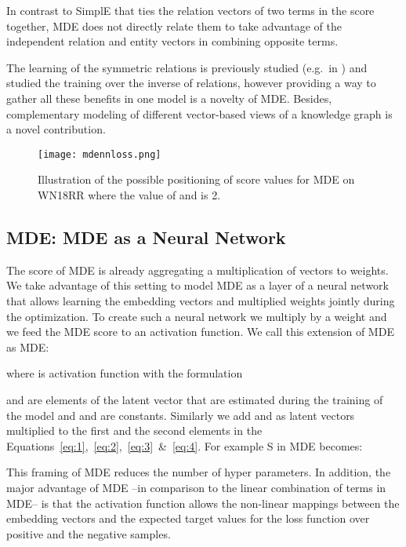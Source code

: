 \documentclass{ecai}
\begin{document}
In contrast to SimplE that ties the relation vectors of two terms in the score together, MDE does not directly relate them to take advantage of the independent relation and entity vectors in combining opposite terms.

The learning of the symmetric relations is previously studied (e.g.\ in \cite{yang2014embedding,sun2019rotate}) and \cite{lin2015modeling} studied the training over the inverse of relations, however providing a way to gather all these benefits in one model is a novelty of MDE. Besides, complementary modeling of different vector-based views of a knowledge graph is a novel contribution. 

\begin{figure}[t]
\centering
\texttt{[image: mdennloss.png]}
\caption{Illustration of the possible positioning of score  values for MDE on WN18RR where the value of  and  is 2.}
\label{fig:mdennloss}
\end{figure}

\subsection{MDE: MDE as a Neural Network}

The score of MDE is already aggregating a multiplication of vectors to weights. We take advantage of this setting to model MDE as a layer of a neural network that allows learning the embedding vectors and multiplied weights jointly during the optimization. To create such a neural network we multiply  by a weight  and we feed the MDE score to an activation function. We call this extension of MDE as MDE:


where  is  activation function with the formulation 

and  are elements of the latent vector  that are estimated during the training of the model and  and  are constants. Similarly we add  and  as latent vectors multiplied to the first and the second elements in the Equations~\ref{eq:1},~\ref{eq:2},~\ref{eq:3}~\&~\ref{eq:4}. For example S in MDE becomes:



This framing of MDE reduces the number of hyper parameters. In addition, the major advantage of MDE --in comparison to the linear combination of terms in MDE-- is that the  activation function allows the non-linear mappings between the embedding vectors and the expected target values for the loss function over positive and the negative samples. 
\end{document}

